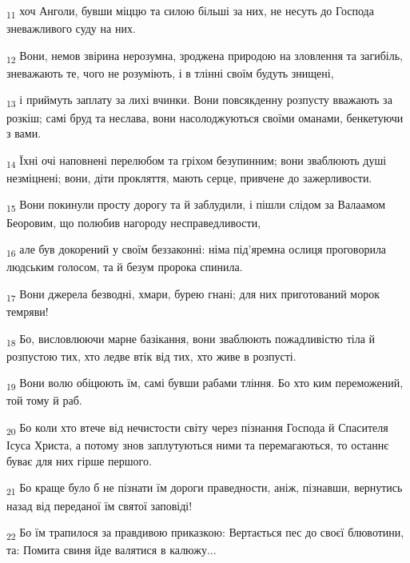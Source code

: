 \begin{tcolorbox}
\textsubscript{11} хоч Анголи, бувши міццю та силою більші за них, не несуть до Господа зневажливого суду на них.
\end{tcolorbox}
\begin{tcolorbox}
\textsubscript{12} Вони, немов звірина нерозумна, зроджена природою на зловлення та загибіль, зневажають те, чого не розуміють, і в тлінні своїм будуть знищені,
\end{tcolorbox}
\begin{tcolorbox}
\textsubscript{13} і приймуть заплату за лихі вчинки. Вони повсякденну розпусту вважають за розкіш; самі бруд та неслава, вони насолоджуються своїми оманами, бенкетуючи з вами.
\end{tcolorbox}
\begin{tcolorbox}
\textsubscript{14} Їхні очі наповнені перелюбом та гріхом безупинним; вони зваблюють душі незміцнені; вони, діти прокляття, мають серце, привчене до зажерливости.
\end{tcolorbox}
\begin{tcolorbox}
\textsubscript{15} Вони покинули просту дорогу та й заблудили, і пішли слідом за Валаамом Беоровим, що полюбив нагороду несправедливости,
\end{tcolorbox}
\begin{tcolorbox}
\textsubscript{16} але був докорений у своїм беззаконні: німа під'яремна ослиця проговорила людським голосом, та й безум пророка спинила.
\end{tcolorbox}
\begin{tcolorbox}
\textsubscript{17} Вони джерела безводні, хмари, бурею гнані; для них приготований морок темряви!
\end{tcolorbox}
\begin{tcolorbox}
\textsubscript{18} Бо, висловлюючи марне базікання, вони зваблюють пожадливістю тіла й розпустою тих, хто ледве втік від тих, хто живе в розпусті.
\end{tcolorbox}
\begin{tcolorbox}
\textsubscript{19} Вони волю обіцюють їм, самі бувши рабами тління. Бо хто ким переможений, той тому й раб.
\end{tcolorbox}
\begin{tcolorbox}
\textsubscript{20} Бо коли хто втече від нечистости світу через пізнання Господа й Спасителя Ісуса Христа, а потому знов заплутуються ними та перемагаються, то останнє буває для них гірше першого.
\end{tcolorbox}
\begin{tcolorbox}
\textsubscript{21} Бо краще було б не пізнати їм дороги праведности, аніж, пізнавши, вернутись назад від переданої їм святої заповіді!
\end{tcolorbox}
\begin{tcolorbox}
\textsubscript{22} Бо їм трапилося за правдивою приказкою: Вертається пес до своєї блювотини, та: Помита свиня йде валятися в калюжу...
\end{tcolorbox}
